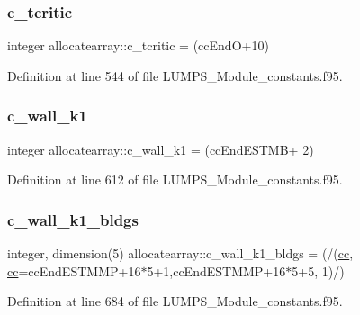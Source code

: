 \subsubsection{\texorpdfstring{c\+\_\+tcritic}{c\_tcritic}}
{\footnotesize\ttfamily integer allocatearray\+::c\+\_\+tcritic = (cc\+EndO+10)}



Definition at line 544 of file L\+U\+M\+P\+S\+\_\+\+Module\+\_\+constants.\+f95.

\mbox{\label{namespaceallocatearray_ac46d57de0eb86fe7eef4d466bbfabf40}} 
\subsubsection{\texorpdfstring{c\+\_\+wall\+\_\+k1}{c\_wall\_k1}}
{\footnotesize\ttfamily integer allocatearray\+::c\+\_\+wall\+\_\+k1 = (cc\+End\+E\+S\+T\+MB+ 2)}



Definition at line 612 of file L\+U\+M\+P\+S\+\_\+\+Module\+\_\+constants.\+f95.

\mbox{\label{namespaceallocatearray_a1777db63886a4bf072822bbc13c75d48}} 
\subsubsection{\texorpdfstring{c\+\_\+wall\+\_\+k1\+\_\+bldgs}{c\_wall\_k1\_bldgs}}
{\footnotesize\ttfamily integer, dimension(5) allocatearray\+::c\+\_\+wall\+\_\+k1\+\_\+bldgs = (/(\hyperlink{namespaceallocatearray_ac863c81704eb507dee10f5e10741e10c}{cc}, \hyperlink{namespaceallocatearray_ac863c81704eb507dee10f5e10741e10c}{cc}=cc\+End\+E\+S\+T\+M\+MP+16$\ast$5+1,cc\+End\+E\+S\+T\+M\+MP+16$\ast$5+5, 1)/)}



Definition at line 684 of file L\+U\+M\+P\+S\+\_\+\+Module\+\_\+constants.\+f95.

\mbox{\label{namespaceallocatearray_adff19937786a50cb75fdd721405f84f4}} 
